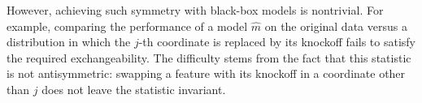 \documentclass{article}
\theoremstyle{plain}
\theoremstyle{definition}
\theoremstyle{remark}
\begin{document}
 
However, achieving such symmetry with black-box models is nontrivial. For example, comparing the performance of a model $\widehat{m}$ on the original data versus a distribution in which the $j$-th coordinate is replaced by its knockoff \cite{Watson2021} fails to satisfy the required exchangeability. The difficulty stems from the fact that this statistic is not antisymmetric: swapping a feature with its knockoff in a coordinate other than $j$ does not leave the statistic invariant.

%
\end{document}
